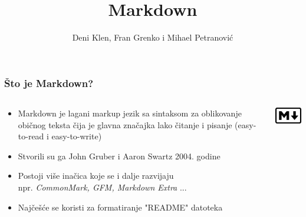 \documentclass{beamer}
\begin{document}
\title{Markdown}
\author{Deni Klen, Fran Grenko i Mihael Petranović}
\maketitle






\begin{frame}
	\frametitle{Što je Markdown?}

 	\begin{minipage}[0.2\textheight]{\textwidth}
 	\begin{columns}[T]
 	\begin{column}{0.8\textwidth}
 	\begin{itemize}
		\item{Markdown je lagani markup jezik sa sintaksom za oblikovanje običnog teksta čija je glavna značajka lako čitanje i pisanje (easy-to-read i easy-to-write)}
		\item{Stvorili su ga John Gruber i Aaron Swartz 2004. godine}
		\item{Postoji više inačica koje se i dalje razvijaju \\ npr. \textit{CommonMark, GFM, Markdown Extra} ...}
		\item{Najčešće se koristi za formatiranje "README" datoteka}
	\end{itemize}
	\end{column}
	\begin{column}{0.2\textwidth}
	\includegraphics[width=2.5cm]{Slike/markdown.png}
	\end{column}
	\end{columns}
	\end{minipage}

\end{frame}
\end{document}
